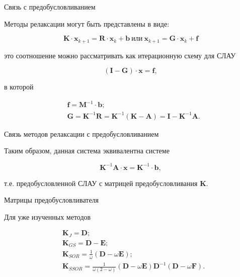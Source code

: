 \documentclass[10pt,xcolor=pst,aspectratio=169]{beamer}
\begin{document}
\begin{frame}{Связь с предобусловливанием}

	\transdissolve[duration=0.2]
	\justifying
	\large
	Методы релаксации могут быть представлены в виде:

	\[
		\textbf{K} \cdot \textbf{x}_{k+1} = \textbf{R} \cdot \textbf{x}_{k} + \textbf{b} \: \mbox{или} \: \textbf{x}_{k+1} = \textbf{G} \cdot \textbf{x}_{k} + \textbf{f}
	\]

	это соотношение можно рассматривать как итерационную схему для СЛАУ

	\[
		\left( \textbf{I} - \textbf{G} \right) \cdot \textbf{x}= \textbf{f},
	\]

	в которой

	\[
		\begin{split}
			&\textbf{f} = \textbf{M}^{-1} \cdot \textbf{b}; \\
			&\textbf{G} = \textbf{K}^{-1} \textbf{R} = \textbf{K}^{-1} \left( \textbf{K} - \textbf{A} \right) = \textbf{I} - \textbf{K}^{-1} \textbf{A}.
		\end{split}
	\]

\end{frame}

\begin{frame}{Связь методов релаксации с предобусловливанием}

	\transdissolve[duration=0.2]
	\justifying
	\large
	Таким образом, данная система эквивалентна системе

	\[
		\textbf{K}^{-1} \textbf{A} \cdot \textbf{x} = \textbf{K}^{-1} \cdot \textbf{b},
	\]

	т.е. предобусловленной СЛАУ с матрицей предобусловливания $\textbf{K}$. 

\end{frame}

\begin{frame}{Матрицы предобусловливателя}

	\transdissolve[duration=0.2]
	\justifying
	\large
	Для уже изученных методов

	\[
		\begin{split}
			&\textbf{K}_{J} = \textbf{D}; \\
			&\textbf{K}_{GS} = \textbf{D} - \textbf{E}; \\
			&\textbf{K}_{SOR} = \frac{1}{\omega} \left( \textbf{D} - \omega \textbf{E} \right); \\
			&\textbf{K}_{SSOR} = \frac{1}{\omega (2 - \omega)} \left( \textbf{D} - \omega \textbf{E} \right) \textbf{D}^{-1} \left( \textbf{D} - \omega \textbf{F} \right).
		\end{split}
	\]

\end{frame}
\end{document}
